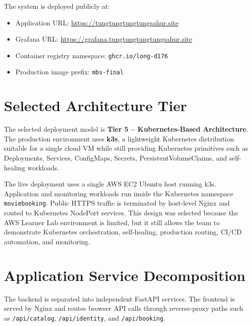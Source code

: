 \documentclass[12pt,a4paper]{report}
\begin{document}
The system is deployed publicly at:

\begin{itemize}[leftmargin=*]
  \item Application URL: \url{https://tungtungtungtungsahur.site}
  \item Grafana URL: \url{https://grafana.tungtungtungtungsahur.site}
  \item Container registry namespace: \texttt{ghcr.io/long-d176}
  \item Production image prefix: \texttt{mbs-final}
\end{itemize}

\section{Selected Architecture Tier}
The selected deployment model is \textbf{Tier 5 -- Kubernetes-Based Architecture}. The production environment uses \textbf{k3s}, a lightweight Kubernetes distribution suitable for a single cloud VM while still providing Kubernetes primitives such as Deployments, Services, ConfigMaps, Secrets, PersistentVolumeClaims, and self-healing workloads.

The live deployment uses a single AWS EC2 Ubuntu host running k3s. Application and monitoring workloads run inside the Kubernetes namespace \texttt{moviebooking}. Public HTTPS traffic is terminated by host-level Nginx and routed to Kubernetes NodePort services. This design was selected because the AWS Learner Lab environment is limited, but it still allows the team to demonstrate Kubernetes orchestration, self-healing, production routing, CI/CD automation, and monitoring.

\section{Application Service Decomposition}
The backend is separated into independent FastAPI services. The frontend is served by Nginx and routes browser API calls through reverse-proxy paths such as \texttt{/api/catalog}, \texttt{/api/identity}, and \texttt{/api/booking}.
\end{document}
